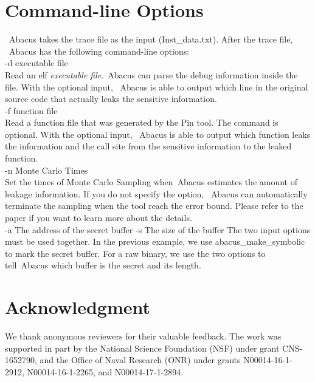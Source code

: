 \documentclass[10pt,conference]{IEEEtran}
\newcommand{\tool}{\textsf{Abacus}}
\begin{document}
\section{Command-line Options}
~\tool{} takes the trace file as the input (\textsf{Inst\_data.txt}). After the trace file, ~\tool{} has the following command-line options:
\vspace{5pt}
\\-d {executable file}
\\ Read an elf \textit{executable file}.~\tool{} can parse the debug information inside the file. With the optional input, ~\tool{} is able to output which line in the original source code that actually leaks the sensitive information.
\vspace{5pt}
\\-f {function file}
\\Read a function file that was generated by the Pin tool. The command is optional. With the optional input, ~\tool{} is able to output which function leaks the information and the call site from the sensitive information to the leaked function.
\vspace{5pt}
\\-n {Monte Carlo Times}
\\ Set the times of Monte Carlo Sampling when~\tool{} estimates the amount of leakage information. If you do not specify the option, ~\tool{} can automatically terminate the sampling when the tool reach the error bound. Please refer to the paper if you want to learn more about the details.
\vspace{5pt}
\\-a {The address of the secret buffer} -s {The size of the buffer}
The two input options must be used together. In the previous example, we use abacus\_make\_symbolic to mark the secret buffer. For a raw binary, we use the two options to tell~\tool{} which buffer is the secret and its length. 

\section*{Acknowledgment}
We thank anonymous reviewers for their valuable feedback. The work was supported in part by the National Science Foundation (NSF) under grant CNS-1652790, and the Office of Naval Research (ONR) under grants N00014-16-1-2912, N00014-16-1-2265, and N00014-17-1-2894. 





\end{document}
